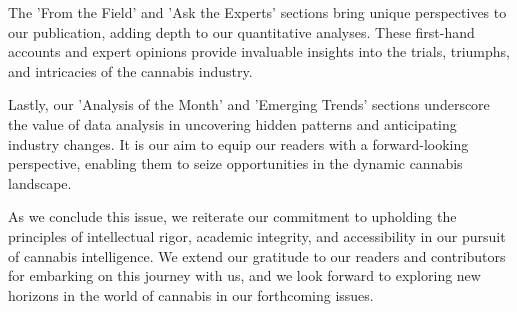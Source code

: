 \documentclass[../article.tex, 12pt]{subfiles}
\begin{document}
\begin{multicols*}{2}
The 'From the Field' and 'Ask the Experts' sections bring unique perspectives to our publication, adding depth to our quantitative analyses. These first-hand accounts and expert opinions provide invaluable insights into the trials, triumphs, and intricacies of the cannabis industry.

Lastly, our 'Analysis of the Month' and 'Emerging Trends' sections underscore the value of data analysis in uncovering hidden patterns and anticipating industry changes. It is our aim to equip our readers with a forward-looking perspective, enabling them to seize opportunities in the dynamic cannabis landscape.

As we conclude this issue, we reiterate our commitment to upholding the principles of intellectual rigor, academic integrity, and accessibility in our pursuit of cannabis intelligence. We extend our gratitude to our readers and contributors for embarking on this journey with us, and we look forward to exploring new horizons in the world of cannabis in our forthcoming issues.


\nocite{*}



\end{multicols*}
\thispagestyle{regular}
\end{document}
